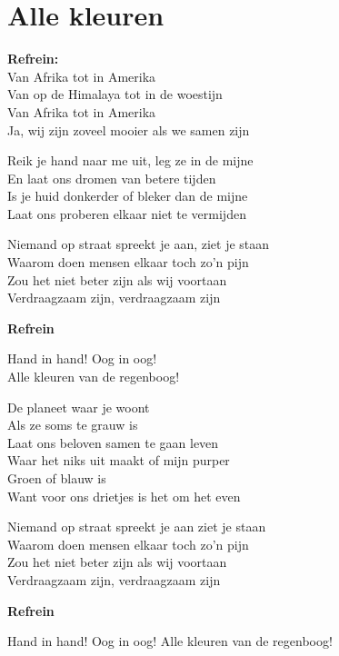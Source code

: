 \section{Alle kleuren}
\textbf{Refrein:}\\
Van Afrika tot in Amerika\\
Van op de Himalaya tot in de woestijn\\
Van Afrika tot in Amerika\\
Ja, wij zijn zoveel mooier als we samen zijn

Reik je hand naar me uit, leg ze in de mijne\\
En laat ons dromen van betere tijden\\
Is je huid donkerder of bleker dan de mijne\\
Laat ons proberen elkaar niet te vermijden

Niemand op straat spreekt je aan, ziet je staan\\
Waarom doen mensen elkaar toch zo'n pijn\\
Zou het niet beter zijn als wij voortaan\\
Verdraagzaam zijn, verdraagzaam zijn

\textbf{Refrein}

Hand in hand! Oog in oog!\\
Alle kleuren van de regenboog!

De planeet waar je woont\\
Als ze soms te grauw is\\
Laat ons beloven samen te gaan leven\\
Waar het niks uit maakt of mijn purper\\
Groen of blauw is\\
Want voor ons drietjes is het om het even

Niemand op straat spreekt je aan ziet je staan\\
Waarom doen mensen elkaar toch zo'n pijn\\
Zou het niet beter zijn als wij voortaan\\
Verdraagzaam zijn, verdraagzaam zijn

\textbf{Refrein}

Hand in hand! Oog in oog!
Alle kleuren van de regenboog!
